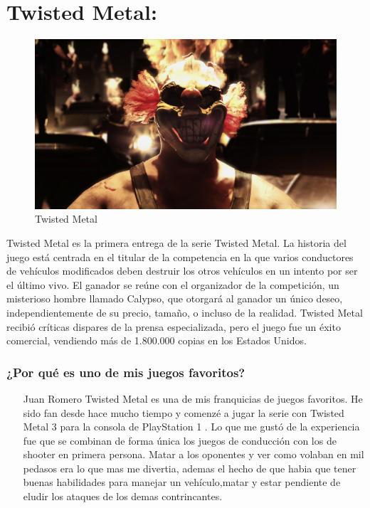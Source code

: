 \section{Twisted Metal: }

\begin{figure}[htbp]
\begin{center}
\includegraphics[width=.60\textwidth]{./imagenes/twistedmetal.jpg}
\caption{Twisted Metal}
\end{center}
\end{figure}

Twisted Metal es la primera entrega de la serie Twisted Metal. La historia del juego está centrada en el titular de la competencia en la que varios conductores de vehículos modificados deben destruir los otros vehículos en un intento por ser el último vivo. El ganador se reúne con el organizador de la competición, un misterioso hombre llamado Calypso, que otorgará al ganador un único deseo, independientemente de su precio, tamaño, o incluso de la realidad.
Twisted Metal recibió críticas dispares de la prensa especializada, pero el juego fue un éxito comercial, vendiendo más de 1.800.000 copias en los Estados Unidos.
\subsubsection{¿Por qué es uno de mis juegos favoritos?}
\begin{itemize}
\item[Juan Romero ] Twisted Metal es una de mis franquicias de juegos favoritos. He sido  fan desde hace mucho tiempo y comenzé a jugar la serie con Twisted Metal 3 para la consola de PlayStation 1 . Lo que me gustó de la experiencia fue que se combinan de forma única los juegos de conducción con los de  shooter en primera persona. Matar a los oponentes y ver como volaban en mil pedasos era lo que mas me divertia, ademas el hecho de que habia que tener buenas habilidades para manejar un vehículo,matar y estar pendiente de eludir los ataques de los demas contrincantes.
\end{itemize}